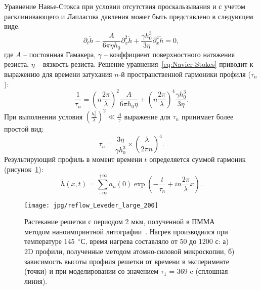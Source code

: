 Уравнение Навье-Стокса при условии отсутствия проскальзывания и с учетом расклинивающего и Лапласова давления может быть представлено в следующем виде:
\begin{equation} \label{eq:Navier-Stokes}
	\partial_t \tilde{h}-\frac{A}{6 \pi \eta h_0} \partial_x^2 \tilde{h}+\frac{\gamma h_0^3}{3 \eta} \partial_x^4 \tilde{h} = 0,
\end{equation}
где $A$ -- постоянная Гамакера, $\gamma$ -- коэффициент поверхностного натяжения резиста, $\eta$ -- вязкость резиста. Решение уравнения~\ref{eq:Navier-Stokes} приводит к выражению для времени затухания $n$-й пространственной гармоники профиля ($\tau_n$):
\begin{equation}
	\frac{1}{\tau_n}=\left(n \frac{2 \pi}{\lambda}\right)^2 \frac{A}{6 \pi h_0 \eta}+\left(n \frac{2 \pi}{\lambda}\right)^4 \frac{\gamma h_0^3}{3 \eta}.
\end{equation}
При выполнении условия $\left(\frac{\displaystyle h_0^2}{\displaystyle \lambda}\right)^2 \ll \frac{\displaystyle A}{\displaystyle \gamma}$ выражение для $\tau_n$ принимает более простой вид:
\begin{equation}
	\tau_n=\frac{3 \eta}{\gamma h_0^3} \times\left(\frac{\lambda}{2 \pi n}\right)^4.
\end{equation}
Результирующий профиль в момент времени $t$ определяется суммой гармоник (рисунок~\ref{fig:ferlow_analytical}):
\begin{equation}
	\tilde{h}(x, t)=\sum_{-\infty}^{+\infty} a_n(0) \exp \left(-\frac{t}{\tau_n}+i n \frac{2 \pi}{\lambda} x\right).
\end{equation}
\begin{figure}[h]
	\begin{center}
		\vspace{-1em}
		\texttt{[image: jpg/reflow\_Leveder\_large\_200]}
		\caption{Растекание решетки с периодом 2 мкм, полученной в ПММА методом наноимпринтной литографии~\cite{Leveder_2011}. Нагрев производился при температуре 145~$^\circ$С, время нагрева составляло от 50 до 1200 с: а) 2D профили, полученные методом атомно-силовой микроскопии, б) зависимость высоты профиля решетки от времени в эксперименте (точки) и при моделировании со значением $\tau_1$ = 369 c (сплошная линия).}
		\label{fig:ferlow_analytical}
	\end{center}
\end{figure}

